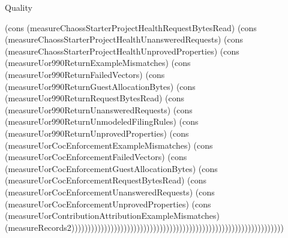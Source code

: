 \begin{lexlean}{Quality}
\begin{semanticmodule}
{(cons (measureChaossStarterProjectHealthRequestBytesRead) (cons (measureChaossStarterProjectHealthUnansweredRequests) (cons (measureChaossStarterProjectHealthUnprovedProperties) (cons (measureUor990ReturnExampleMismatches) (cons (measureUor990ReturnFailedVectors) (cons (measureUor990ReturnGuestAllocationBytes) (cons (measureUor990ReturnRequestBytesRead) (cons (measureUor990ReturnUnansweredRequests) (cons (measureUor990ReturnUnmodeledFilingRules) (cons (measureUor990ReturnUnprovedProperties) (cons (measureUorCocEnforcementExampleMismatches) (cons (measureUorCocEnforcementFailedVectors) (cons (measureUorCocEnforcementGuestAllocationBytes) (cons (measureUorCocEnforcementRequestBytesRead) (cons (measureUorCocEnforcementUnansweredRequests) (cons (measureUorCocEnforcementUnprovedProperties) (cons (measureUorContributionAttributionExampleMismatches) (measureRecords2)))))))))))))))))))))))))))))))))))))))))))))))))))))))))))))))))
}


\end{semanticmodule}
\end{lexlean}
